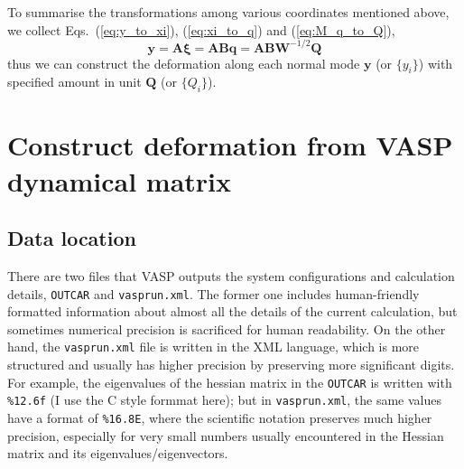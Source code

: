 \documentclass[a4paper,notitlepage,preprint]{revtex4-1}
\newcommand\mbf{\mathbf}
\begin{document}
To summarise the transformations among various coordinates mentioned above, we collect Eqs.~(\ref{eq:y_to_xi}), (\ref{eq:xi_to_q}) and (\ref{eq:M_q_to_Q}),
\begin{equation}
	\mbf{y} = \mbf{A}\bm{\xi} = \mbf{A}\mbf{B}\mbf{q} = \mbf{A}\mbf{B}\mbf{W}^{-1/2}\mbf{Q}
	\label{eq:Q_to_y}
\end{equation}
\noindent thus we can construct the deformation along each normal mode $\mbf{y}$ (or $\{y_i\}$) with specified amount in unit $\mbf{Q}$ (or $\{Q_i\}$).

\section{Construct deformation from VASP dynamical matrix}
\subsection{Data location}
There are two files that VASP outputs the system configurations and calculation details, \verb|OUTCAR| and \verb|vasprun.xml|. The former one includes human-friendly formatted information about almost all the details of the current calculation, but sometimes numerical precision is sacrificed for human readability. On the other hand, the \verb|vasprun.xml| file is written in the XML language, which is more structured and usually has higher precision by preserving more significant digits. For example, the eigenvalues of the hessian matrix in the \verb|OUTCAR| is written with \verb|%12.6f| (I use the C style formmat here); but in \verb|vasprun.xml|, the same values have a format of \verb|%16.8E|, where the scientific notation preserves much higher precision, especially for very small numbers usually encountered in the Hessian matrix and its eigenvalues/eigenvectors.
\end{document}
